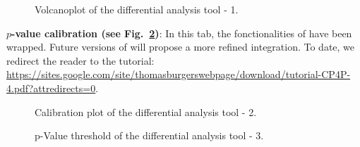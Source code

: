 \documentclass[12pt]{article}
\begin{document}
{\begin {figure}
\centering
{}
\caption{Volcanoplot of the differential analysis tool - 1.}
\label{fig:anadiff1}
\end {figure}


\textbf{$p$-value calibration (see Fig.~\ref{fig:anadiff2})}: In this tab, 
the fonctionalities of  have been wrapped. Future versions of 
 will propose a more refined integration. To date, we 
redirect the reader to the  tutorial: 
\url{https://sites.google.com/site/thomasburgerswebpage/download/tutorial-CP4P-
4.pdf?attredirects=0}. 

\begin {figure}
\centering
{}
\caption{Calibration plot of the differential analysis tool - 2.}
\label{fig:anadiff2}
\end {figure}


\begin {figure}
\centering
{}
\caption{p-Value threshold of the differential analysis tool - 3.}
\label{fig:anadiff3}
\end {figure}

}
\end{document}
